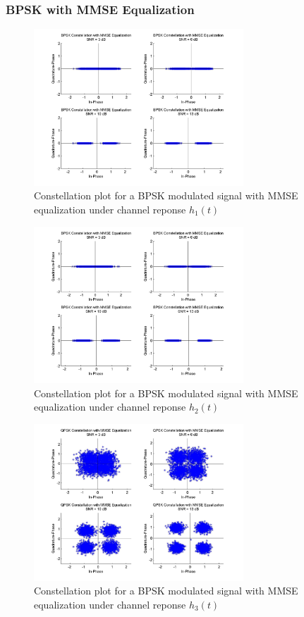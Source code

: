 \documentclass[]{article}
\begin{document}
\subsubsection{BPSK with MMSE Equalization}

\begin{figure}[H]
\centering
\includegraphics[width=0.7\textwidth]{bpConstMMSE1.jpg}
\caption{Constellation plot for a BPSK modulated signal with MMSE equalization under channel reponse $h_1(t)$}
\end{figure}

\begin{figure}[H]
\centering
\includegraphics[width=0.7\textwidth]{bpConstMMSE2.jpg}
\caption{Constellation plot for a BPSK modulated signal with MMSE equalization under channel reponse $h_2(t)$}
\end{figure}

\begin{figure}[H]
\centering
\includegraphics[width=0.7\textwidth]{qpConstMMSE3.jpg}
\caption{Constellation plot for a BPSK modulated signal with MMSE equalization under channel reponse $h_3(t)$}
\end{figure}
\end{document}

